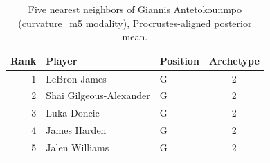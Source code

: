 \begin{table}[htbp]
  \centering\small
  \begin{tabular}{rllc}
    \toprule
    Rank & Player & Position & Archetype \\
    \midrule
    1 & LeBron James & G & 2 \\
    2 & Shai Gilgeous-Alexander & G & 2 \\
    3 & Luka Doncic & G & 2 \\
    4 & James Harden & G & 2 \\
    5 & Jalen Williams & G & 2 \\
    \bottomrule
  \end{tabular}
  \caption{Five nearest neighbors of Giannis Antetokounmpo (curvature_m5 modality), Procrustes-aligned posterior mean.}
  \label{tab:Giannis_Antetokounmpo_neighbors_curvature_m5}
\end{table}

